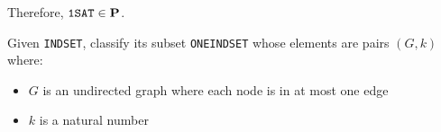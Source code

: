\begin{ex}[\kSAT{1}]
\begin{solution}
		Therefore, $\kSAT{1} \in \P$.
	\end{solution}


\end{ex}

\begin{ex}
	Given \texttt{INDSET}, classify its subset \texttt{ONEINDSET} whose elements are pairs $(G,k)$ where:
	\begin{itemize}
		\item $G$ is an undirected graph where each node is in at most one edge
		\item $k$ is a natural number
	\end{itemize}
\end{ex}

